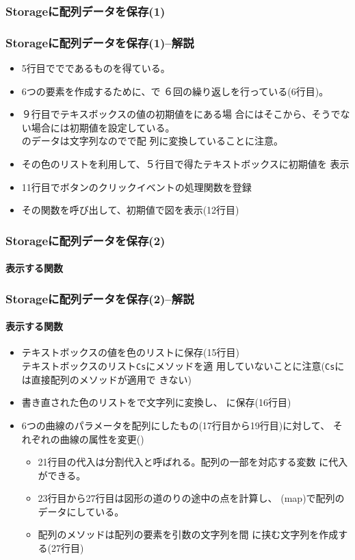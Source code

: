\begin{frame}[containsverbatim]
 \frametitle{Storageに配列データを保存(1)}
\end{frame}
\begin{frame}[containsverbatim]
 \frametitle{Storageに配列データを保存(1)--解説}
 \begin{itemize}
	\item 5行目ででであるものを得ている。
	\item 6つの要素を作成するために、で
				６回の繰り返しを行っている(6行目)。
	\item ９行目でテキスボックスの値の初期値をにある場
				合にはそこから、そうでない場合には初期値を設定している。\\
				のデータは文字列なのでで配
				列に変換していることに注意。
	\item その色のリストを利用して、５行目で得たテキストボックスに初期値を
				表示
	\item 11行目でボタンのクリックイベントの処理関数を登録
	\item その関数を呼び出して、初期値で図を表示(12行目)
 \end{itemize}
\end{frame}
\begin{frame}[containsverbatim]
 \frametitle{Storageに配列データを保存(2)}
 \framesubtitle{表示する関数}
\end{frame}
\begin{frame}[containsverbatim]
 \frametitle{Storageに配列データを保存(2)--解説}
 \framesubtitle{表示する関数}
\begin{itemize}
 \item テキストボックスの値を色のリストに保存(15行目)\\
			 テキストボックスのリスト\texttt{Cs}にメソッドを適
			 用していないことに注意(\texttt{Cs}には直接配列のメソッドが適用で
			 きない)
 \item 書き直された色のリストをで文字列に変換し、
			 に保存(16行目)
 \item 6つの曲線のパラメータを配列にしたもの(17行目から19行目)に対して、
			 それぞれの曲線の属性を変更()
			 \begin{itemize}
				\item 21行目の代入は分割代入と呼ばれる。配列の一部を対応する変数
							に代入ができる。
				\item 23行目から27行目は図形の道のりの途中の点を計算し、
							\JSKey(map)で配列のデータにしている。
				\item 配列のメソッドは配列の要素を引数の文字列を間
							に挟む文字列を作成する(27行目)
			 \end{itemize}
\end{itemize}
\end{frame}
